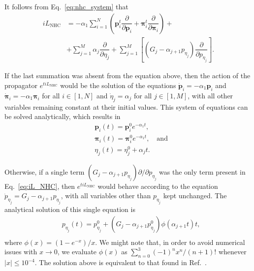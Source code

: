 \documentclass[aip,jcp,reprint,amsmath,amssymb,raggedbottom]{revtex4-1}
\newcommand{\vt}[1]{\boldsymbol{\mathbf{#1}}}           %
\newcommand{\tr}[1]{#1^t}                               %
\newcommand{\diff}[2]{\dfrac{\partial #1}{\partial #2}} %
\begin{document}
It follows from Eq.~\ref{eq:nhc_system} that
\begin{equation}
\label{eq:iL_NHC}
\begin{split}
i\!L_\text{NHC} &= -\alpha_1 \sum_{i=1}^N \left( \tr{\vt p}_i \diff{}{\vt p_i} + \tr{\vt \pi}_i \diff{}{\vt \pi_i}\right) + \\
&+ \sum_{j=1}^M \alpha_j \diff{}{\eta_j} + \sum_{j=1}^M \left[ (G_j - \alpha_{j+1} p_{\eta_j}) \diff{}{p_{\eta_j}} \right].
\end{split}
\end{equation}

If the last summation was absent from the equation above, then the action of the propagator $e^{t i\!L_\text{NHC}}$ would be the solution of the equations $\dot{\vt p}_i = -\alpha_1 \vt p_i$ and $\dot{\vt \pi}_i = -\alpha_1 \vt \pi_i$ for all $i \in [1,N]$ and $\dot{\eta}_j = \alpha_j$ for all $j \in [1,M]$, with all other variables remaining constant at their initial values. This system of equations can be solved analytically, which results in
\begin{subequations}
\begin{align}
&\vt p_i(t) = \vt p_i^0 e^{-\alpha_1 t}, \\
&\vt \pi_i(t) = \vt \pi_i^0 e^{-\alpha_1 t}, \quad \text{and}\\
&\eta_j(t) = \eta_j^0 + \alpha_j t. \label{eq:solution_eta}
\end{align}
\end{subequations}

Otherwise, if a single term $(G_j - \alpha_{j+1} p_{\eta_j}) \partial/\partial p_{\eta_j}$ was the only term present in Eq.~\ref{eq:iL_NHC}, then $e^{t i\!L_\text{NHC}}$ would behave according to the equation $\dot{p}_{\eta_j} = G_j - \alpha_{j+1} p_{\eta_j}$, with all variables other than $p_{\eta_j}$ kept unchanged. The analytical solution of this single equation is
\begin{equation}
\label{eq:solution_p_eta}
\begin{split}
&p_{\eta_j}(t) = p_{\eta_j}^0 + \left( G_j - \alpha_{j+1} p_{\eta_j}^0 \right) \phi\left(\alpha_{j+1} t\right) t, \\
\end{split}
\end{equation}
where $\phi(x) = (1-e^{-x})/x$. We might note that, in order to avoid numerical issues with $x \rightarrow 0$, we evaluate $\phi(x)$ as $\sum_{n=0}^3 {(-1)^n x^n}/{(n+1)!}$ whenever $|x| \leq 10^{-4}$. The solution above is equivalent to that found in Ref.~.
\end{document}
